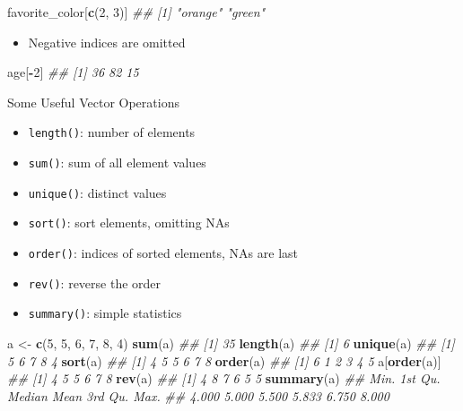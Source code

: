 \documentclass[]{book}
\newenvironment{Shaded}{\begin{snugshade}}{\end{snugshade}}
\newcommand{\CommentTok}[1]{\textcolor[rgb]{0.56,0.35,0.01}{\textit{#1}}}
\newcommand{\DecValTok}[1]{\textcolor[rgb]{0.00,0.00,0.81}{#1}}
\newcommand{\KeywordTok}[1]{\textcolor[rgb]{0.13,0.29,0.53}{\textbf{#1}}}
\newcommand{\NormalTok}[1]{#1}
\newcommand{\OperatorTok}[1]{\textcolor[rgb]{0.81,0.36,0.00}{\textbf{#1}}}
\newcommand{\StringTok}[1]{\textcolor[rgb]{0.31,0.60,0.02}{#1}}
\providecommand{\tightlist}{%
  \setlength{\itemsep}{0pt}\setlength{\parskip}{0pt}}
\begin{document}
\begin{Shaded}
\begin{Highlighting}[]
\NormalTok{favorite_color[}\KeywordTok{c}\NormalTok{(}\DecValTok{2}\NormalTok{, }\DecValTok{3}\NormalTok{)]}
\CommentTok{## [1] "orange" "green"}
\end{Highlighting}
\end{Shaded}

\begin{itemize}
\tightlist
\item
  Negative indices are omitted
\end{itemize}

\begin{Shaded}
\begin{Highlighting}[]
\NormalTok{age[}\OperatorTok{-}\DecValTok{2}\NormalTok{]}
\CommentTok{## [1] 36 82 15}
\end{Highlighting}
\end{Shaded}

Some Useful Vector Operations

\begin{itemize}
\tightlist
\item
  \texttt{length()}: number of elements
\item
  \texttt{sum()}: sum of all element values
\item
  \texttt{unique()}: distinct values
\item
  \texttt{sort()}: sort elements, omitting NAs
\item
  \texttt{order()}: indices of sorted elements, NAs are last
\item
  \texttt{rev()}: reverse the order
\item
  \texttt{summary()}: simple statistics
\end{itemize}

\begin{Shaded}
\begin{Highlighting}[]
\NormalTok{a <-}\StringTok{ }\KeywordTok{c}\NormalTok{(}\DecValTok{5}\NormalTok{, }\DecValTok{5}\NormalTok{, }\DecValTok{6}\NormalTok{, }\DecValTok{7}\NormalTok{, }\DecValTok{8}\NormalTok{, }\DecValTok{4}\NormalTok{)}
\KeywordTok{sum}\NormalTok{(a)}
\CommentTok{## [1] 35}
\KeywordTok{length}\NormalTok{(a)}
\CommentTok{## [1] 6}
\KeywordTok{unique}\NormalTok{(a)}
\CommentTok{## [1] 5 6 7 8 4}
\KeywordTok{sort}\NormalTok{(a)}
\CommentTok{## [1] 4 5 5 6 7 8}
\KeywordTok{order}\NormalTok{(a)}
\CommentTok{## [1] 6 1 2 3 4 5}
\NormalTok{a[}\KeywordTok{order}\NormalTok{(a)]}
\CommentTok{## [1] 4 5 5 6 7 8}
\KeywordTok{rev}\NormalTok{(a)}
\CommentTok{## [1] 4 8 7 6 5 5}
\KeywordTok{summary}\NormalTok{(a)}
\CommentTok{##    Min. 1st Qu.  Median    Mean 3rd Qu.    Max. }
\CommentTok{##   4.000   5.000   5.500   5.833   6.750   8.000}
\end{Highlighting}
\end{Shaded}
\end{document}
